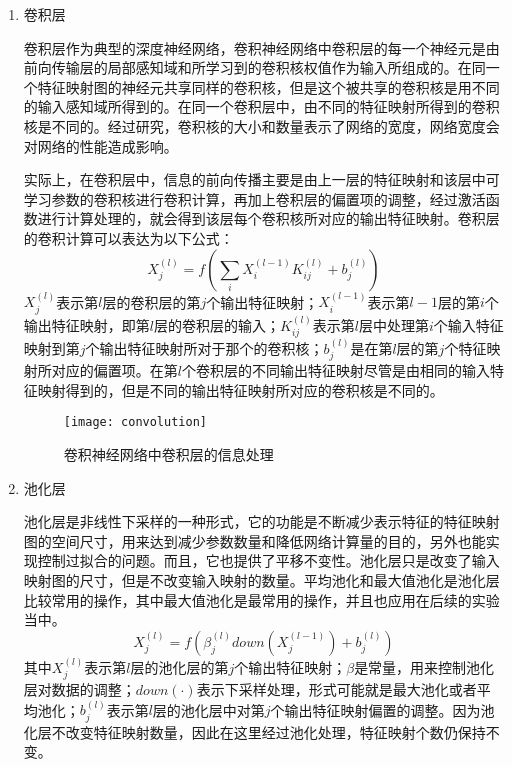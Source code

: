 \begin{enumerate}
\item 卷积层

卷积层作为典型的深度神经网络，卷积神经网络中卷积层的每一个神经元是由前向传输层的局部感知域和所学习到的卷积核权值作为输入所组成的。在同一个特征映射图的神经元共享同样的卷积核，但是这个被共享的卷积核是用不同的输入感知域所得到的。在同一个卷积层中，由不同的特征映射所得到的卷积核是不同的。经过研究，卷积核的大小和数量表示了网络的宽度，网络宽度会对网络的性能造成影响。

实际上，在卷积层中，信息的前向传播主要是由上一层的特征映射和该层中可学习参数的卷积核进行卷积计算，再加上卷积层的偏置项的调整，经过激活函数进行计算处理的，就会得到该层每个卷积核所对应的输出特征映射。卷积层的卷积计算可以表达为以下公式：
\begin{equation}
X_{j}^{(l)} = f(\sum_{i} X_{i}^{(l-1)}  K_{ij}^{(l)} + b_{j}^{(l)})
\end{equation}
$X_{j}^{(l)}$表示第$l$层的卷积层的第$j$个输出特征映射；$X_{i}^{(l-1)}$表示第$l-1$层的第$i$个输出特征映射，即第$l$层的卷积层的输入；$K_{ij}^{(l)}$表示第$l$层中处理第$i$个输入特征映射到第$j$个输出特征映射所对于那个的卷积核；$b_{j}^{(l)}$是在第$l$层的第$j$个特征映射所对应的偏置项。在第$l$个卷积层的不同输出特征映射尽管是由相同的输入特征映射得到的，但是不同的输出特征映射所对应的卷积核是不同的。

\begin{figure}[H] %
  \centering
  \texttt{[image: convolution]}
  \caption{卷积神经网络中卷积层的信息处理}
\end{figure}


\item 池化层 

池化层是非线性下采样的一种形式，它的功能是不断减少表示特征的特征映射图的空间尺寸，用来达到减少参数数量和降低网络计算量的目的，另外也能实现控制过拟合的问题。而且，它也提供了平移不变性。池化层只是改变了输入映射图的尺寸，但是不改变输入映射的数量。平均池化和最大值池化是池化层比较常用的操作，其中最大值池化是最常用的操作，并且也应用在后续的实验当中。
\begin{equation}
X_{j}^{(l)} = f( \beta_{j}^{(l)} down(X_{j}^{(l-1)}) + b_{j}^{(l)})
\end{equation}			
其中$X_{j}^{(l)}$表示第$l$层的池化层的第$j$个输出特征映射；$\beta$是常量，用来控制池化层对数据的调整；$down(\cdot)$表示下采样处理，形式可能就是最大池化或者平均池化；$b_{j}^{(l)}$表示第$l$层的池化层中对第$j$个输出特征映射偏置的调整。因为池化层不改变特征映射数量，因此在这里经过池化处理，特征映射个数仍保持不变。


\end{enumerate}
